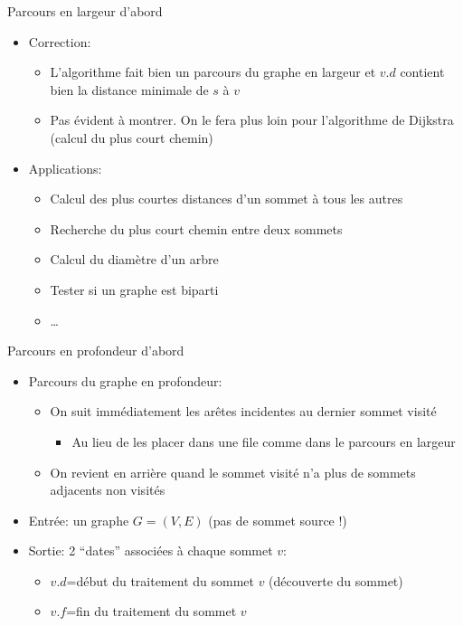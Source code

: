 \begin{frame}{Parcours en largeur d'abord}

\begin{itemize}
\item Correction:
\begin{itemize}
\item L'algorithme fait bien un parcours du graphe en largeur et $v.d$ contient bien la distance minimale de $s$ à $v$
\item Pas évident à montrer. On le fera plus loin pour l'algorithme de Dijkstra (calcul du plus court chemin)
\end{itemize}

\bigskip

\item Applications:
\begin{itemize}
\item Calcul des plus courtes distances d'un sommet à tous les autres
\item Recherche du plus court chemin entre deux sommets
\item Calcul du diamètre d'un arbre
\item Tester si un graphe est biparti
\item \ldots
\end{itemize}
\end{itemize}
\end{frame}


\begin{frame}{Parcours en profondeur d'abord}

\begin{itemize}
\item Parcours du graphe en profondeur:
\begin{itemize}
\item On suit immédiatement les arêtes incidentes au dernier sommet visité
\begin{itemize}
\item Au lieu de les placer dans une file comme dans le parcours en largeur
\end{itemize}
\item On revient en arrière quand le sommet visité n'a plus de sommets adjacents non visités
\end{itemize}

\bigskip

\item Entrée: un graphe $G=(V,E)$ (pas de sommet source !)
\item Sortie: 2 ``dates'' associées à chaque sommet $v$:
\begin{itemize}
\item $v.d$=début du traitement du sommet $v$ (découverte du sommet)
\item $v.f$=fin du traitement du sommet $v$
\end{itemize}
\end{itemize}

\end{frame}

